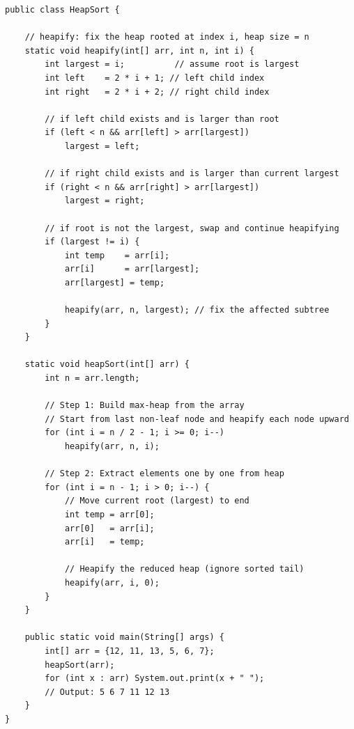 \documentclass[12pt,a4paper,oneside]{book}
\begin{document}
\begin{lstlisting}[caption={Heap Sort --- in-place O(n log n), not stable}]
public class HeapSort {

    // heapify: fix the heap rooted at index i, heap size = n
    static void heapify(int[] arr, int n, int i) {
        int largest = i;          // assume root is largest
        int left    = 2 * i + 1; // left child index
        int right   = 2 * i + 2; // right child index

        // if left child exists and is larger than root
        if (left < n && arr[left] > arr[largest])
            largest = left;

        // if right child exists and is larger than current largest
        if (right < n && arr[right] > arr[largest])
            largest = right;

        // if root is not the largest, swap and continue heapifying
        if (largest != i) {
            int temp    = arr[i];
            arr[i]      = arr[largest];
            arr[largest] = temp;

            heapify(arr, n, largest); // fix the affected subtree
        }
    }

    static void heapSort(int[] arr) {
        int n = arr.length;

        // Step 1: Build max-heap from the array
        // Start from last non-leaf node and heapify each node upward
        for (int i = n / 2 - 1; i >= 0; i--)
            heapify(arr, n, i);

        // Step 2: Extract elements one by one from heap
        for (int i = n - 1; i > 0; i--) {
            // Move current root (largest) to end
            int temp = arr[0];
            arr[0]   = arr[i];
            arr[i]   = temp;

            // Heapify the reduced heap (ignore sorted tail)
            heapify(arr, i, 0);
        }
    }

    public static void main(String[] args) {
        int[] arr = {12, 11, 13, 5, 6, 7};
        heapSort(arr);
        for (int x : arr) System.out.print(x + " ");
        // Output: 5 6 7 11 12 13
    }
}
\end{lstlisting}
\end{document}
